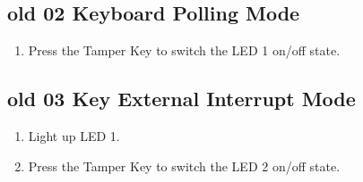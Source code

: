 \documentclass[12pt,a4paper]{ctexart}
\begin{document}
\subsection{old 02 Keyboard Polling Mode}

\begin{enumerate}
    \item Press the Tamper Key to switch the LED 1 on/off state.
\end{enumerate}

\subsection{old 03 Key External Interrupt Mode}

\begin{enumerate}
    \item Light up LED 1.
    \item Press the Tamper Key to switch the LED 2 on/off state.
\end{enumerate}
\end{document}
